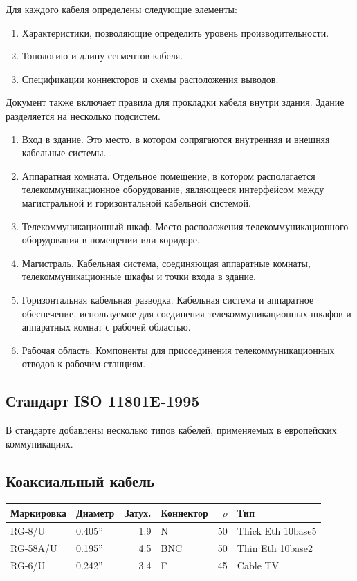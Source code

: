 \documentclass[12pt, russian, oneside, article]{ncc}
\begin{document}
Для каждого кабеля определены следующие элементы:
\begin{enumerate}
\item Характеристики, позволяющие определить уровень производительности.
\item Топологию и длину сегментов кабеля.
\item Спецификации коннекторов и схемы расположения выводов.
\end{enumerate}

Документ также включает правила для прокладки кабеля внутри здания. Здание разделяется на несколько подсистем.
\begin{enumerate}
\item Вход в здание. Это место, в котором сопрягаются внутренняя и внешняя кабельные системы.
\item Аппаратная комната. Отдельное помещение, в котором располагается телекоммуникационное оборудование, являющееся интерфейсом между магистральной и горизонтальной кабельной системой.
\item Телекоммуникационный шкаф. Место расположения телекоммуникационного оборудования в помещении или коридоре.
\item Магистраль. Кабельная система, соединяющая аппаратные комнаты, телекоммуникационные шкафы и точки входа в здание.
\item Горизонтальная кабельная разводка. Кабельная система и аппаратное обеспечение, используемое для соединения телекоммуникационных шкафов и аппаратных комнат с рабочей областью.
\item Рабочая область. Компоненты для присоединения телекоммуникационных отводов к рабочим станциям.
\end{enumerate}
\subsection{Стандарт ISO 11801E-1995}
\label{sec-4_3}


В стандарте добавлены несколько типов кабелей, применяемых в европейских коммуникациях.
\subsection{Коаксиальный кабель}
\label{sec-4_4}



\begin{center}
\begin{tabular}{llrlrl}
 Маркировка  &  Диаметр  &  Затух.  &  Коннектор  &  $\rho$  &  Тип                \\
\hline
 RG-8/U      &  0.405''  &     1.9  &  N          &      50  &  Thick Eth 10base5  \\
 RG-58A/U    &  0.195''  &     4.5  &  BNC        &      50  &  Thin Eth 10base2   \\
 RG-6/U      &  0.242''  &     3.4  &  F          &      45  &  Cable TV           \\
\end{tabular}
\end{center}
\end{document}
